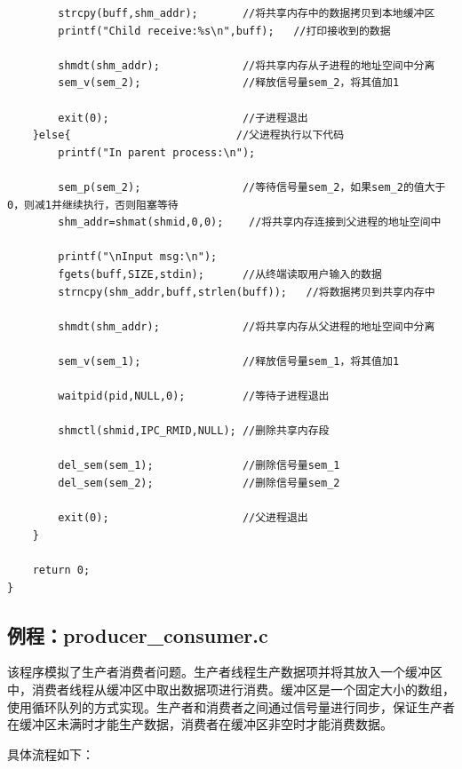 \documentclass[12pt, a4paper, oneside]{ctexbook}
\numberwithin{figure}{section}
\begin{document}
\begin{verbatim}
        strcpy(buff,shm_addr);       //将共享内存中的数据拷贝到本地缓冲区
        printf("Child receive:%s\n",buff);   //打印接收到的数据

        shmdt(shm_addr);             //将共享内存从子进程的地址空间中分离
        sem_v(sem_2);                //释放信号量sem_2，将其值加1

        exit(0);                     //子进程退出
    }else{                          //父进程执行以下代码
        printf("In parent process:\n");
        
        sem_p(sem_2);                //等待信号量sem_2，如果sem_2的值大于0，则减1并继续执行，否则阻塞等待
        shm_addr=shmat(shmid,0,0);    //将共享内存连接到父进程的地址空间中

        printf("\nInput msg:\n");    
        fgets(buff,SIZE,stdin);      //从终端读取用户输入的数据
        strncpy(shm_addr,buff,strlen(buff));   //将数据拷贝到共享内存中

        shmdt(shm_addr);             //将共享内存从父进程的地址空间中分离

        sem_v(sem_1);                //释放信号量sem_1，将其值加1

        waitpid(pid,NULL,0);         //等待子进程退出

        shmctl(shmid,IPC_RMID,NULL); //删除共享内存段

        del_sem(sem_1);              //删除信号量sem_1
        del_sem(sem_2);              //删除信号量sem_2

        exit(0);                     //父进程退出
    }

    return 0;
}

\end{verbatim}

\subsection{例程：producer\_consumer.c}
该程序模拟了生产者消费者问题。生产者线程生产数据项并将其放入一个缓冲区中，消费者线程从缓冲区中取出数据项进行消费。缓冲区是一个固定大小的数组，使用循环队列的方式实现。生产者和消费者之间通过信号量进行同步，保证生产者在缓冲区未满时才能生产数据，消费者在缓冲区非空时才能消费数据。

具体流程如下：
\end{document}
